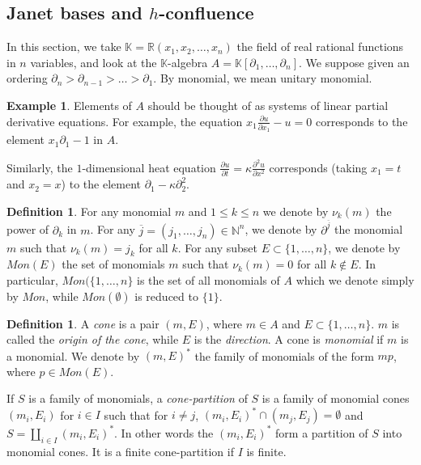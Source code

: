\documentclass[10pt]{easychair}
\theoremstyle{definition}
\newtheorem{definition}[theorem]{Definition}
\newtheorem{example}[theorem]{Example}
\newcommand\K{\mathbb{K}}
\begin{document}
\subsection{Janet bases and $h$-confluence}

In this section, we take $\K = \mathbb R(x_1,x_2,\ldots,x_n)$ the field of real rational functions in $n$ variables, and look at the $\K$-algebra $A = \K[\partial_1,\ldots,\partial_n]$. We suppose given an ordering $\partial_n > \partial_{n-1} > \ldots > \partial_1$. By monomial, we mean unitary monomial.

\begin{example}
  Elements of $A$ should be thought of as systems of linear partial derivative equations. For example, the equation $x_1 \frac{\partial u}{\partial x_1} - u = 0$ corresponds to the element $x_1 \partial_1 - 1$ in $A$.

  Similarly, the $1$-dimensional heat equation $\frac{\partial u}{\partial t} = \kappa \frac{\partial^2 u}{\partial x^2}$  corresponds (taking $x_1 = t$ and $x_2 = x$) to the element $\partial_1 - \kappa \partial_2^2$.
\end{example}

\begin{definition}
 For any monomial $m$ and $1 \leq k \leq n$ we denote by $\nu_k(m)$ the power of $\partial_k$ in $m$.
For any $\overline j =(j_1,\ldots,j_n) \in \mathbb N^n$, we denote by $\partial^{\overline j}$ the monomial $m$ such that $\nu_k(m) = j_k$ for all $k$. For any subset $E \subset \{1,\ldots,n\}$, we denote by $Mon(E)$ the set of monomials $m$ such that $\nu_k(m) = 0$ for all $k \notin E$. In particular, $Mon(\{1,\ldots,n\}$ is the set of all monomials of $A$ which we denote simply by $Mon$, while $Mon(\emptyset)$ is reduced to $\{1\}$. 
\end{definition}

\begin{definition}
  A \emph{cone} is a pair $(m,E)$, where $m \in A$ and $E \subset \{1,\ldots,n\}$. $m$ is called the \emph{origin of the cone}, while $E$ is the \emph{direction}. A cone is \emph{monomial} if $m$ is a monomial. We denote by $(m,E)^*$ the family of monomials of the form $mp$, where $p \in Mon(E)$.

  If $S$ is a family of monomials, a \emph{cone-partition} of $S$ is a family of monomial cones $(m_i,E_i)$ for $i \in I$ such that for $i \neq j$, $(m_i,E_i)^* \cap (m_j,E_j) = \emptyset$ and $S = \coprod_{i \in I} (m_i,E_i)^*$. In other words the $(m_i,E_i)^*$ form a partition of $S$ into monomial cones. It is a finite cone-partition if $I$ is finite.
\end{definition}
\end{document}

